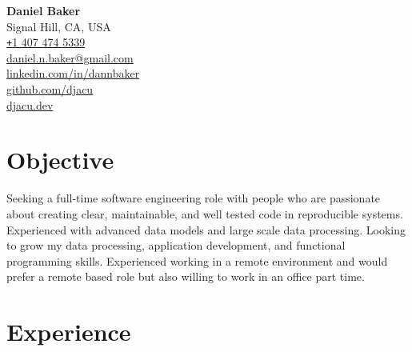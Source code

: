 



\begin{flushleft}
    \textbf{\Huge Daniel Baker} \vspace{0.5em} \\
    Signal Hill, CA, USA \\
    \href{tel:14074745339}{\texttt{+}1 407 474 5339} \\
    \href{mailto:daniel.n.baker@gmail.com}{daniel.n.baker@gmail.com} \\
    \href{https://www.linkedin.com/in/dannbaker/}{linkedin.com/in/dannbaker} \\
    \href{https://github.com/djacu}{github.com/djacu} \\
    \href{https://djacu.dev/}{djacu.dev}
\end{flushleft}

\section{Objective}

\begin{blockquote}
    Seeking a full-time software engineering role with people who are passionate about creating clear, maintainable, and well tested code in reproducible systems.
    Experienced with advanced data models and large scale data processing.
    Looking to grow my data processing, application development, and functional programming skills.
    Experienced working in a remote environment and would prefer a remote based role but also willing to work in an office part time.
\end{blockquote}

\section{Experience}

